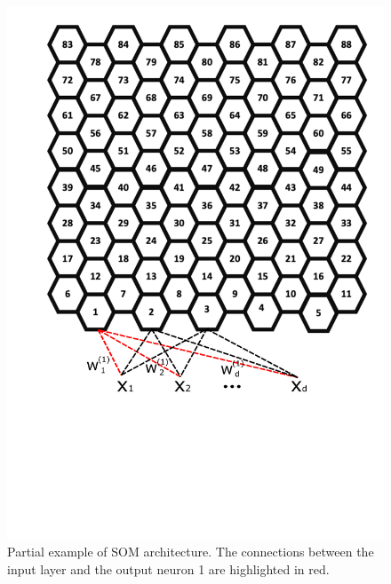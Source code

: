 \begin{figure}[h!]
\centering
\includegraphics[scale=0.35]{"Part 3 - Learning Systems/Unsupervised Learning/Self-Organizing Maps/figs/arquitetura.pdf"}
\caption{Partial example of SOM architecture. The connections between the input layer and the output neuron 1 are highlighted in red.}
\label{fig:architecuture}
\end{figure}



